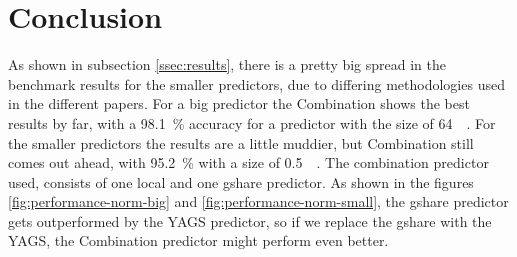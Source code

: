 \section{Conclusion}
\label{sec:conclusion}
As shown in subsection \ref{ssec:results}, there is a pretty big spread in the benchmark results for the smaller predictors, due to differing methodologies used in the different papers.
For a big predictor the Combination shows the best results by far, with a \SI{98.1}{\percent} accuracy for a predictor with the size of \SI{64}{\kilo\byte}.
For the smaller predictors the results are a little muddier, but Combination still comes out ahead, with \SI{95.2}{\percent} with a size of \SI{0.5}{\kilo\byte}.
The combination predictor used, consists of one local and one gshare predictor.
As shown in the figures \ref{fig:performance-norm-big} and \ref{fig:performance-norm-small}, the gshare predictor gets outperformed by the YAGS predictor, so if we replace the gshare with the YAGS, the Combination predictor might perform even better.